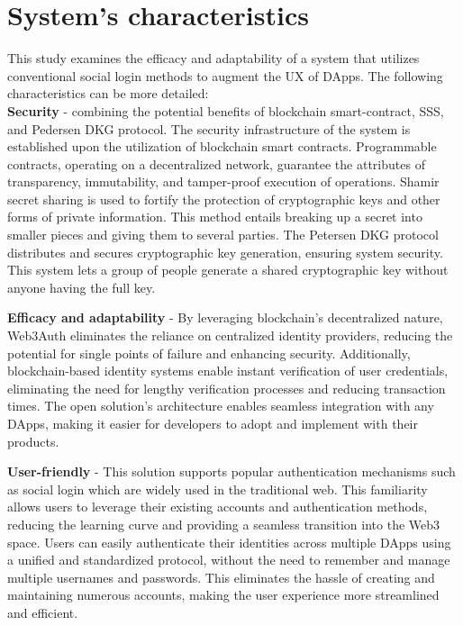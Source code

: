 \documentclass[../Main.tex]{subfiles}
\begin{document}
\section{System's characteristics}
This study examines the efficacy and adaptability of a system that utilizes conventional social login methods to augment the UX of DApps. The following characteristics can be more detailed: \\
\indent\textbf{Security} - combining the potential benefits of blockchain smart-contract, SSS, and Pedersen DKG protocol. The security infrastructure of the system is established upon the utilization of blockchain smart contracts. Programmable contracts, operating on a decentralized network, guarantee the attributes of transparency, immutability, and tamper-proof execution of operations. Shamir secret sharing is used to fortify the protection of cryptographic keys and other forms of private information. This method entails breaking up a secret into smaller pieces and giving them to several parties. The Petersen DKG protocol distributes and secures cryptographic key generation, ensuring system security. This system lets a group of people generate a shared cryptographic key without anyone having the full key. 

\indent\textbf{Efficacy and adaptability} - By leveraging blockchain's decentralized nature, Web3Auth eliminates the reliance on centralized identity providers, reducing the potential for single points of failure and enhancing security. Additionally, blockchain-based identity systems enable instant verification of user credentials, eliminating the need for lengthy verification processes and reducing transaction times. The open solution's architecture enables seamless integration with any DApps, making it easier for developers to adopt and implement with their products. 

\indent\textbf{User-friendly} - This solution supports popular authentication mechanisms such as social login which are widely used in the traditional web. This familiarity allows users to leverage their existing accounts and authentication methods, reducing the learning curve and providing a seamless transition into the Web3 space. Users can easily authenticate their identities across multiple DApps using a unified and standardized protocol, without the need to remember and manage multiple usernames and passwords. This eliminates the hassle of creating and maintaining numerous accounts, making the user experience more streamlined and efficient.
\end{document}

